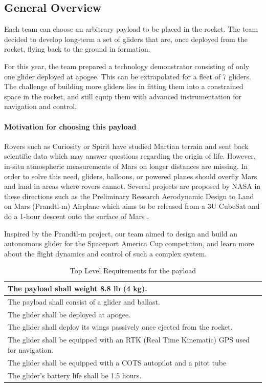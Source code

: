 \subsection{General Overview}

Each team can choose an arbitrary payload to be placed in the rocket. The team decided to develop long-term a set of gliders that are, once deployed from the rocket, flying back to the ground in formation.

For this year, the team prepared a technology demonstrator consisting of only one glider deployed at apogee. This can be extrapolated for a fleet of 7 gliders. The challenge of building more gliders lies in fitting them into a constrained space in the rocket, and still equip them with advanced instrumentation for navigation and control.

\paragraph{Motivation for choosing this payload}
\hfill \break
Rovers such as Curiosity or Spirit have studied Martian terrain and sent back scientific data which may answer questions regarding the origin of life. However, in-situ atmospheric measurements of Mars on longer distances are missing. In order to solve this need, gliders, balloons, or powered planes should overfly Mars and land in areas where rovers cannot. Several projects are proposed by NASA in these directions such as the Preliminary Research Aerodynamic Design to Land on Mars (Prandtl-m) Airplane which aims to be released from a 3U CubeSat and do a 1-hour descent onto the surface of Mars \cite{mars}.

Inspired by the Prandtl-m project, our team aimed to design and build an autonomous glider for the Spaceport America Cup competition, and learn more about the flight dynamics and control of such a complex system.

\begin{table}[h!]
\centering
\begin{tabular}{|p{}|}
\hline
    The payload shall weight 8.8 lb (4 kg). \\ \hline
    The payload shall consist of a glider and ballast.  \\ \hline
    The glider shall be deployed at apogee. \\ \hline
    The glider shall deploy its wings passively once ejected from the rocket. \\ \hline
    The glider shall be equipped with an RTK (Real Time Kinematic) GPS used for navigation. \\ \hline
    The glider shall be equipped with a COTS autopilot and a pitot tube \\ \hline
    The glider's battery life shall be 1.5 hours. \\ \hline
\end{tabular}
\caption{Top Level Requirements for the payload}
\label{table:se_topLevelR}
\end{table}


